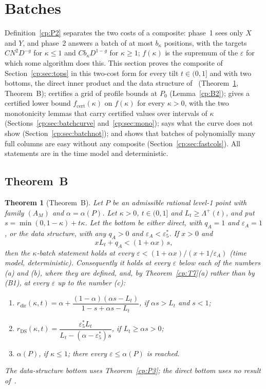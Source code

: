 \documentclass[11pt]{article}
\newtheorem{theorem}{Theorem}[section]
\theoremstyle{definition}
\theoremstyle{remark}
\providecommand{\eps}{\varepsilon}
\newcommand{\es}{\varepsilon^*_5}             %
\newcommand{\bk}{b_\kappa}                    %
\newcommand{\fbat}{f}                         %
\newcommand{\Lamp}{\Lambda^{+}}               %
\newcommand{\ThmB}{Theorem~B}                               %
\newcommand{\Pzero}{P_0}                      %
\newcommand{\rdir}{r_{\mathrm{dir}}}                 %
\newcommand{\rDS}{r_{\mathrm{DS}}}                   %
\newcommand{\fcert}{\fbat_{\mathrm{cert}}}           %
\begin{document}
\section{Batches}\label{cp:sec:batch}

Definition~\ref{cp:P2} separates the two costs of a composite: phase~1 sees only $X$ and $Y$, and phase~2 answers a batch of at most $\bk$ positions, with the targets $CN^2D^{-g}$ for $\kappa\le1$ and $C\bk D^{1-g}$ for $\kappa\ge1$; $\fbat(\kappa)$ is the supremum of the $\eps$ for which some algorithm does this. This section proves the composite of Section~\ref{cp:sec:tops} in this two-cost form for every tilt $t\in(0,1]$ and with two bottoms, the direct inner product and the data structure of~\cite{v2} (Theorem~\ref{cp:B1}, \ThmB); certifies a grid of profile bounds at $\Pzero$ (Lemma~\ref{cp:B2}); gives a certified lower bound $\fcert(\kappa)$ on $\fbat(\kappa)$ for every $\kappa>0$, with the two monotonicity lemmas that carry certified values over intervals of $\kappa$ (Sections~\ref{cp:sec:batchcurve} and~\ref{cp:sec:mono}); says what the curve does not show (Section~\ref{cp:sec:batchnot}); and shows that batches of polynomially many full columns are easy without any composite (Section~\ref{cp:sec:fastcols}). All statements are in the time model and deterministic.

\subsection{\texorpdfstring{\ThmB}{Theorem B}}\label{cp:sec:thmB}

\begin{theorem}[\ThmB]\label{cp:B1}
Let $P$ be an admissible rational level-1 point with family $(A_M)$ and $\alpha=\alpha(P)$. Let $\kappa>0$, $t\in(0,1]$ and $L_t\ge\Lamp(t)$, and put $s=\min(0,1-\kappa)+t\kappa$. Let the bottom be either \emph{direct}, with $q_A=1$ and $\eps_A=1$, or the \emph{data structure}, with any $q_A>0$ and $\eps_A<\es$. If $x>0$ and
\[
xL_t+q_A<(1+\alpha x)\,s,\tag{B1}
\]
then the $\kappa$-batch statement holds at every $\eps<(1+\alpha x)/(x+1/\eps_A)$ (time model, deterministic). Consequently it holds at every $\eps$ below each of the numbers (a) and (b), where they are defined, and, by Theorem~\ref{cp:T7}(a) rather than by (B1), at every $\eps$ up to the number (c):
\begin{enumerate}[label=(\alph*)]
\item $\rdir(\kappa,t)=\alpha+\dfrac{(1-\alpha)(\alpha s-L_t)}{1-s+\alpha s-L_t}$, if $\alpha s>L_t$ and $s<1$;
\item $\rDS(\kappa,t)=\dfrac{\es L_t}{L_t-(\alpha-\es)s}$, if $L_t\ge\alpha s>0$;
\item $\alpha(P)$, if $\kappa\le1$; there every $\eps\le\alpha(P)$ is reached.
\end{enumerate}
The data-structure bottom uses Theorem~\ref{cp:P3}; the direct bottom uses no result of~\cite{v2}.
\end{theorem}
\end{document}
